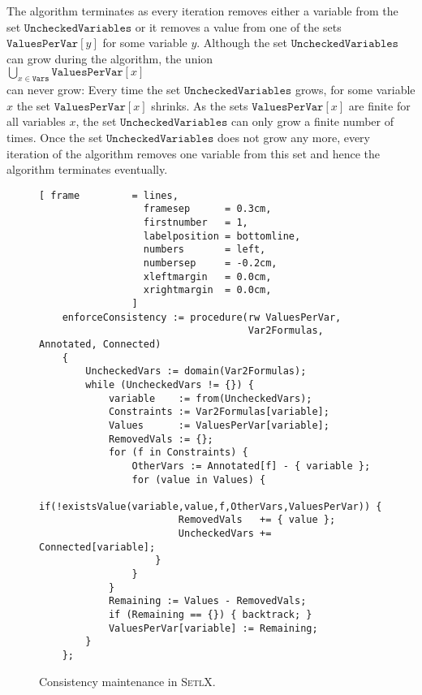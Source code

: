 The algorithm terminates as every iteration removes either a variable from the set
$\texttt{UncheckedVariables}$ or it removes a value from one of the sets $\texttt{ValuesPerVar}[y]$ for some
variable $y$.  Although the set $\texttt{UncheckedVariables}$ can grow during the algorithm,  the union
\\[0.2cm]
\hspace*{1.3cm}
$\bigcup\limits_{x \in \mathtt{Vars}} \texttt{ValuesPerVar}[x]$ 
\\[0.2cm]
can never grow:  Every time the set $\texttt{UncheckedVariables}$ grows,
for some variable $x$ the set $\texttt{ValuesPerVar}[x]$ shrinks.
As the sets $\texttt{ValuesPerVar}[x]$ are finite for all variables $x$, the set
$\texttt{UncheckedVariables}$ can only grow a finite number of times. 
Once the set $\texttt{UncheckedVariables}$ does not grow any more, every iteration of the algorithm removes one
variable from this set and hence the algorithm terminates eventually.

\begin{figure}[!ht]
\centering
\begin{Verbatim}[ frame         = lines, 
                  framesep      = 0.3cm, 
                  firstnumber   = 1,
                  labelposition = bottomline,
                  numbers       = left,
                  numbersep     = -0.2cm,
                  xleftmargin   = 0.0cm,
                  xrightmargin  = 0.0cm,
                ]
    enforceConsistency := procedure(rw ValuesPerVar,
                                    Var2Formulas, Annotated, Connected)
    {
        UncheckedVars := domain(Var2Formulas);
        while (UncheckedVars != {}) {
            variable    := from(UncheckedVars);
            Constraints := Var2Formulas[variable];
            Values      := ValuesPerVar[variable];
            RemovedVals := {};
            for (f in Constraints) {
                OtherVars := Annotated[f] - { variable };
                for (value in Values) {
                    if(!existsValue(variable,value,f,OtherVars,ValuesPerVar)) {
                        RemovedVals   += { value };
                        UncheckedVars += Connected[variable];
                    }
                }
            }
            Remaining := Values - RemovedVals;
            if (Remaining == {}) { backtrack; }
            ValuesPerVar[variable] := Remaining;
        }
    };
\end{Verbatim}
\vspace*{-0.3cm}
\caption{Consistency maintenance in \textsc{SetlX}.}
\label{fig:csp-consistency.stlx:enforceConsistency}
\end{figure}

